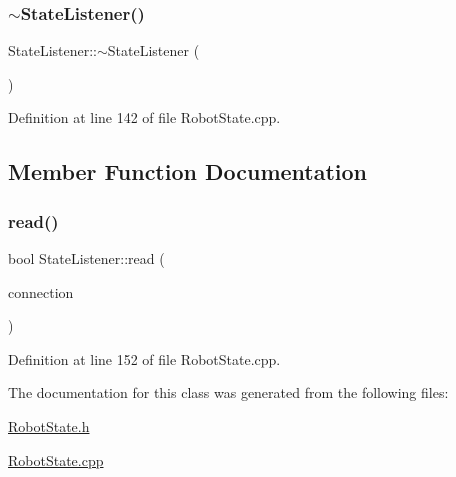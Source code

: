 \hypertarget{classocra__recipes_1_1StateListener_a84961512f9533cc039ca2deefbabbb73}{}\label{classocra__recipes_1_1StateListener_a84961512f9533cc039ca2deefbabbb73} 
\subsubsection{\texorpdfstring{$\sim$\+State\+Listener()}{~StateListener()}}
{\footnotesize\ttfamily State\+Listener\+::$\sim$\+State\+Listener (\begin{DoxyParamCaption}{ }\end{DoxyParamCaption})\hspace{0.3cm}{\ttfamily [virtual]}}



Definition at line 142 of file Robot\+State.\+cpp.



\subsection{Member Function Documentation}
\hypertarget{classocra__recipes_1_1StateListener_a10196cebd253c4b98fb39371c95cc68a}{}\label{classocra__recipes_1_1StateListener_a10196cebd253c4b98fb39371c95cc68a} 
\subsubsection{\texorpdfstring{read()}{read()}}
{\footnotesize\ttfamily bool State\+Listener\+::read (\begin{DoxyParamCaption}\item[{yarp\+::os\+::\+Connection\+Reader \&}]{connection }\end{DoxyParamCaption})}



Definition at line 152 of file Robot\+State.\+cpp.



The documentation for this class was generated from the following files\+:\begin{DoxyCompactItemize}
\item 
\hyperlink{RobotState_8h}{Robot\+State.\+h}\item 
\hyperlink{RobotState_8cpp}{Robot\+State.\+cpp}\end{DoxyCompactItemize}
